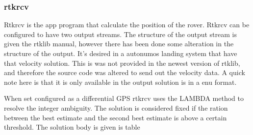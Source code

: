 \subsubsection{rtkrcv}
Rtkrcv is the app program that calculate the position of the rover.
Rtkrcv can be configured to have two output streams. The structure of the output stream is given the rtklib manual, however there has been done some alteration in the structure of the output. It's desired in a autonumos landing system that have that velocity solution. This is was not provided in the newest version of rtklib, and therefore the source code was altered to send out the velocity data. A quick note here is that it is only available in the output solution is in a enu format.

When set configured as a differential GPS rtkrcv uses the LAMBDA method to resolve the integer ambiguity. The solution is considered fixed if the ration between the best estimate and the second best estimate is above a certain threshold.
The solution body is given is table 
